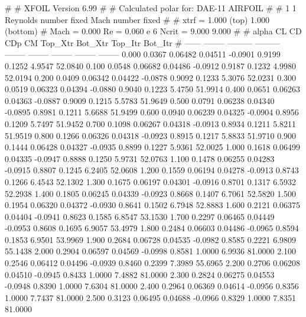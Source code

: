 #  
#       XFOIL         Version 6.99
#  
# Calculated polar for: DAE-11 AIRFOIL                                  
#  
# 1 1 Reynolds number fixed          Mach number fixed         
#  
# xtrf =   1.000 (top)        1.000 (bottom)  
# Mach =   0.000     Re =     0.060 e 6     Ncrit =   9.000  9.000
#  
#   alpha    CL        CD       CDp       CM     Top_Xtr  Bot_Xtr  Top_Itr  Bot_Itr
#  ------ -------- --------- --------- -------- -------- -------- -------- --------
   0.000   0.0367   0.06482   0.04511  -0.0901   0.9199   0.1252   4.9547  52.0840
   0.100   0.0548   0.06682   0.04486  -0.0912   0.9187   0.1232   4.9980  52.0194
   0.200   0.0409   0.06342   0.04422  -0.0878   0.9092   0.1233   5.3076  52.0231
   0.300   0.0519   0.06323   0.04394  -0.0880   0.9040   0.1223   5.4750  51.9914
   0.400   0.0651   0.06263   0.04363  -0.0887   0.9009   0.1215   5.5783  51.9649
   0.500   0.0791   0.06238   0.04340  -0.0895   0.8981   0.1211   5.6688  51.9499
   0.600   0.0940   0.06239   0.04325  -0.0904   0.8956   0.1209   5.7497  51.9452
   0.700   0.1098   0.06267   0.04318  -0.0913   0.8934   0.1211   5.8211  51.9519
   0.800   0.1266   0.06326   0.04318  -0.0923   0.8915   0.1217   5.8833  51.9710
   0.900   0.1444   0.06428   0.04327  -0.0935   0.8899   0.1227   5.9361  52.0025
   1.000   0.1618   0.06499   0.04335  -0.0947   0.8888   0.1250   5.9731  52.0763
   1.100   0.1478   0.06255   0.04283  -0.0915   0.8807   0.1245   6.2405  52.0608
   1.200   0.1559   0.06194   0.04278  -0.0913   0.8743   0.1266   6.4543  52.1302
   1.300   0.1675   0.06197   0.04301  -0.0916   0.8701   0.1317   6.5932  52.2938
   1.400   0.1805   0.06245   0.04339  -0.0923   0.8668   0.1407   6.7061  52.5820
   1.500   0.1954   0.06320   0.04372  -0.0930   0.8641   0.1502   6.7948  52.8883
   1.600   0.2121   0.06375   0.04404  -0.0941   0.8623   0.1585   6.8547  53.1530
   1.700   0.2297   0.06465   0.04449  -0.0953   0.8608   0.1695   6.9057  53.4979
   1.800   0.2484   0.06603   0.04486  -0.0965   0.8594   0.1853   6.9501  53.9969
   1.900   0.2684   0.06728   0.04535  -0.0982   0.8585   0.2221   6.9809  55.1438
   2.000   0.2904   0.06597   0.04569  -0.0998   0.8581   1.0000   6.9936  81.0000
   2.100   0.2546   0.06412   0.04496  -0.0939   0.8460   0.2399   7.3989  55.6965
   2.200   0.2706   0.06208   0.04510  -0.0945   0.8433   1.0000   7.4882  81.0000
   2.300   0.2824   0.06275   0.04553  -0.0948   0.8390   1.0000   7.6304  81.0000
   2.400   0.2964   0.06369   0.04614  -0.0956   0.8356   1.0000   7.7437  81.0000
   2.500   0.3123   0.06495   0.04688  -0.0966   0.8329   1.0000   7.8351  81.0000
